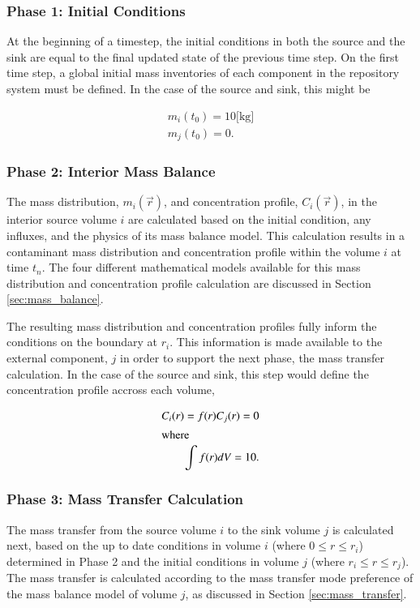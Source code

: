 \subsubsection{Phase 1: Initial Conditions}

At the beginning of a timestep, the initial conditions in both the source and 
the sink are equal to the final updated state of the previous time step.
On the first time step, a global initial mass inventories of each component in 
the repository system must be defined. In the case of the source and sink, this 
might be

\begin{align}
 m_i(t_0) = 10 \mbox{[kg]}\\
 m_j(t_0) = 0.
\end{align}

\subsubsection{Phase 2: Interior Mass Balance}

The mass distribution, $m_i(\vec{r})$, and concentration profile, $C_i(\vec{r})$, in the interior source volume 
$i$ are calculated based on the initial condition, any influxes, and the physics of 
its mass balance model.  This calculation results in a contaminant mass 
distribution and concentration profile within the volume $i$ at time $t_n$.  
The four different mathematical models available for this mass distribution and 
concentration profile calculation are discussed in Section \ref{sec:mass_balance}.

The resulting mass distribution and concentration profiles fully inform
the conditions on the boundary at $r_i$. This information is made available 
to the external component, $j$ in order to support the next phase, the mass 
transfer calculation. In the case of the source and sink, this step would 
define the concentration profile accross each volume,

\begin{align}
C_i(r) = f(r) 
C_j(r) = 0\\
\intertext{where}
\int f(r)dV = 10.
\end{align}

\subsubsection{Phase 3: Mass Transfer Calculation}

The mass transfer from the source volume $i$ to the sink volume $j$ is 
calculated next, based on the up to date conditions in volume $i$ (where $0\le r \le r_i$) 
determined in Phase 2 and the initial conditions in volume $j$ (where $r_i \le 
r \le r_j$). The mass transfer is calculated according to the mass transfer mode 
preference of the mass balance model of volume $j$, as discussed in Section 
\ref{sec:mass_transfer}. 

